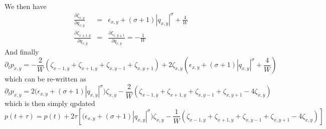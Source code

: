 \documentclass[12pt, a4paper, prl]{revtex4}
\newcommand{\abs}[1]{\left| #1 \right|}
\begin{document}
We then have
\begin{eqnarray*}
\frac{\partial\zeta_{x,y}}{\partial q_{x,y}} &=& \epsilon_{x,y}  + \left(\sigma +1\right) \abs{q_{x,y}}^\sigma + \frac{4}{W} \\
\frac{\partial\zeta_{x\pm 1,y}}{\partial q_{x,y}} &=&
\frac{\partial\zeta_{x,y\pm 1}}{\partial q_{x,y}} = -\frac{1}{W} 
\end{eqnarray*}
And finally
\begin{equation*}
 \partial_t p_{x,y} =
 - \frac{2}{W} \left( \zeta_{x-1,y} + \zeta_{x+1,y} + \zeta_{x,y-1} + \zeta_{x,y+1} \right)
+
 2 \zeta_{x,y} \left( \epsilon_{x,y}  + \left(\sigma +1\right) \abs{q_{x,y}}^\sigma + \frac{4}{W} \right)
\end{equation*}
which can be re-written as
\begin{equation*}
 \partial_t p_{x,y} =
  2 \Big(\epsilon_{x,y}  + \left(\sigma +1\right) \abs{q_{x,y}}^\sigma \Big) \zeta_{x,y} 
 - \frac{2}{W} \left( \zeta_{x-1,y} + \zeta_{x+1,y} + \zeta_{x,y-1} + \zeta_{x,y+1} - 4 \zeta_{x,y} \right)
\end{equation*}
which is then simply qpdated 
\begin{equation*}
p(t+\tau) = p(t) + 2\tau \left[  \Big(\epsilon_{x,y}  + \left(\sigma +1\right) \abs{q_{x,y}}^\sigma \Big) \zeta_{x,y} 
 - \frac{1}{W}\left( \zeta_{x-1,y} + \zeta_{x+1,y} + \zeta_{x,y-1} + \zeta_{x,y+1} - 4 \zeta_{x,y} \right)\right]
\end{equation*}


\begin{thebibliography}{99}
\end{thebibliography}
\end{document}

